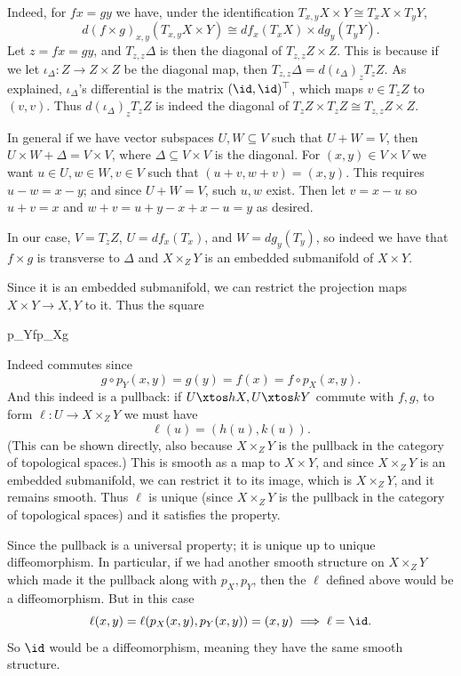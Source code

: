    Indeed, for $fx=gy$ we have, under the identification $T_{x,y}X\times Y\cong T_xX\times T_yY$,
    $$ d(f\times g)_{x,y}(T_{x,y}X\times Y) \cong df_x(T_xX) \times dg_y(T_yY) . $$
    Let $z=fx=gy$, and $T_{z,z}\Delta$ is then the diagonal of $T_{z,z}Z\times Z$.
    This is because if we let $\iota_\Delta\colon Z\to Z\times Z$ be the diagonal map, then
    $T_{z,z}\Delta=d(\iota_\Delta)_zT_zZ$.
    As explained, $\iota_\Delta$'s differential is the matrix $(\id,\id)^\top$, which maps $v\in T_zZ$ to $(v,v)$.
    Thus $d(\iota_\Delta)_zT_zZ$ is indeed the diagonal of $T_zZ\times T_zZ\cong T_{z,z}Z\times Z$.

    In general if we have vector subspaces $U,W\subseteq V$ such that $U+W=V$, then $U\times W+\Delta=V\times V$,
    where $\Delta\subseteq V\times V$ is the diagonal.
    For $(x,y)\in V\times V$ we want $u\in U,w\in W,v\in V$ such that $(u+v,w+v)=(x,y)$.
    This requires $u-w=x-y$; and since $U+W=V$, such $u,w$ exist.
    Then let $v=x-u$ so $u+v=x$ and $w+v=u+y-x+x-u=y$ as desired.

    In our case, $V=T_zZ$, $U=df_x(T_x)$, and $W=dg_y(T_y)$, so indeed we have that $f\times g$ is transverse to $\Delta$
    and $X\times_ZY$ is an embedded submanifold of $X\times Y$.

    Since it is an embedded submanifold, we can restrict the projection maps $X\times Y\to X,Y$ to it.
    Thus the square

        {p_Y}{f}{p_X}{g}

    Indeed commutes since
    $$ g\circ p_Y(x,y) = g(y) = f(x) = f\circ p_X(x,y) . $$
    And this indeed is a pullback: if $U\xtos hX,U\xtos kY$ commute with $f,g$, to form $\ell\colon U\to X\times_ZY$ we must
    have
    $$ \ell(u) = (h(u),k(u)) . $$
    (This can be shown directly, also because $X\times_ZY$ is the pullback in the category of topological spaces.)
    This is smooth as a map to $X\times Y$, and since $X\times_ZY$ is an embedded submanifold, we can restrict it to its
    image, which is $X\times_ZY$, and it remains smooth.
    Thus $\ell$ is unique (since $X\times_ZY$ is the pullback in the category of topological spaces) and it satisfies the
    property.

    Since the pullback is a universal property; it is unique up to unique diffeomorphism.
    In particular, if we had another smooth structure on $X\times_ZY$ which made it the pullback along with $p_X,p_Y$,
    then the $\ell$ defined above would be a diffeomorphism.
    But in this case
    $$ \ell(x,y) = \ell(p_X(x,y),p_Y(x,y)) = (x,y) \implies \ell = \id . $$
    So $\id$ would be a diffeomorphism, meaning they have the same smooth structure.

